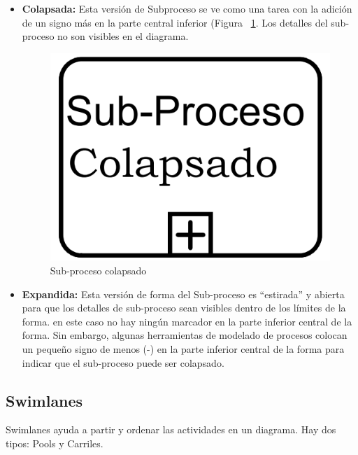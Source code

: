 \begin{itemize}
	\item \textbf{Colapsada: }Esta versión de Subproceso se ve como una tarea con la adición de un signo más en la parte central inferior (Figura ~\ref{subprocesoC}. Los detalles del sub-proceso no son visibles en el diagrama.
	
	\begin{figure}[H]
		\centering
		\includegraphics[scale=0.2]{Capitulo2/imagenes/subprocesoC} 
		\caption{Sub-proceso colapsado}
		\label{subprocesoC}
	\end{figure}
	\item \textbf{Expandida: }Esta versión de forma del Sub-proceso es ``estirada'' y abierta para que los detalles de sub-proceso sean visibles dentro de los límites de la forma. en este caso no hay ningún marcador en la parte inferior central de la forma. Sin embargo, algunas herramientas de modelado de procesos colocan un pequeño signo de menos (-) en la parte inferior central de la forma para indicar que el sub-proceso  puede ser colapsado.
\end{itemize}

\subsection{Swimlanes}
Swimlanes ayuda a partir y ordenar las actividades en un diagrama. Hay dos tipos: Pools y Carriles.
